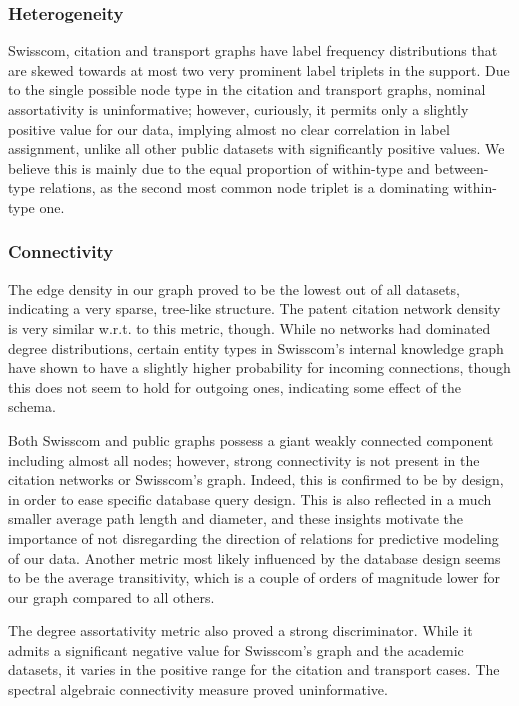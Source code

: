 \subsubsection{Heterogeneity} 
Swisscom, citation and transport graphs have label frequency distributions that are skewed towards at most two very prominent label triplets in the support. Due to the single possible node type in the citation and transport graphs, nominal assortativity is uninformative; however, curiously, it permits only a slightly positive value for our data, implying almost no clear correlation in label assignment, unlike all other public datasets with significantly positive values. We believe this is mainly due to the equal proportion of within-type and between-type relations, as the second most common node triplet is a dominating within-type one.

\subsubsection{Connectivity} 
The edge density in our graph proved to be the lowest out of all datasets, indicating a very sparse, tree-like structure. The patent citation network density is very similar w.r.t. to this metric, though. While no networks had dominated degree distributions, certain entity types in Swisscom's internal knowledge graph have shown to have a slightly higher probability for incoming connections, though this does not seem to hold for outgoing ones, indicating some effect of the schema. 

Both Swisscom and public graphs possess a giant weakly connected component including almost all nodes; however, strong connectivity is not present in the citation networks or Swisscom's graph. Indeed, this is confirmed to be by design, in order to ease specific database query design. This is also reflected in a much smaller average path length and diameter, and these insights motivate the importance of not disregarding the direction of relations for predictive modeling of our data. Another metric most likely influenced by the database design seems to be the average transitivity, which is a couple of orders of magnitude lower for our graph compared to all others. 

The degree assortativity metric also proved a strong discriminator. While it admits a significant negative value for Swisscom's graph and the academic datasets, it varies in the positive range for the citation and transport cases. The spectral algebraic connectivity measure proved uninformative.

